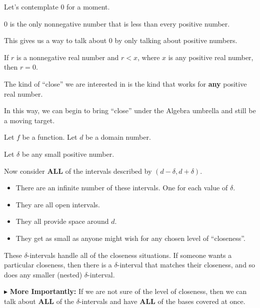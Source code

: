 \documentclass{ximera}
\begin{document}
Let's contemplate $0$ for a moment. 

\begin{fact}


$0$ is the only nonnegative number that is less than every positive number.


\end{fact}

This gives us a way to talk about $0$ by only talking about positive numbers. 



If $r$ is a nonnegative real number and $r < x$, where $x$ is any positive real number, then $r = 0$.







\begin{idea}


The kind of ``close'' we are interested in is the kind that works for \textbf{\textcolor{purple!85!blue}{any}} positive real number.


\end{idea}






In this way, we can begin to bring ``close'' under the Algebra umbrella and still be a moving target.


Let $f$ be a function. Let $d$ be a domain number.

Let $\delta$ be any small positive number.

Now consider \textbf{\textcolor{red!70!black}{ALL}} of the intervals described by $(d - \delta, d + \delta)$.


\begin{itemize}
\item There are an infinite number of these intervals. One for each value of $\delta$.
\item They are all open intervals.
\item They all provide space around $d$.
\item They get as small as anyone might wish for any chosen level of ``closeness''.
\end{itemize}

These $\delta$-intervals handle all of the closeness situations.  If someone wants a particular closeness, then there is a $\delta$-interval that matches their closeness, and so does any smaller (nested) $\delta$-interval.



\textbf{\textcolor{red!70!darkgray}{$\blacktriangleright$}} \textbf{\textcolor{purple!85!blue}{More Importantly:}} If we are not sure of the level of closeness, then we can talk about \textbf{\textcolor{red!70!black}{ALL}} of the $\delta$-intervals and have \textbf{\textcolor{red!70!black}{ALL}} of the bases covered at once.
\end{document}

